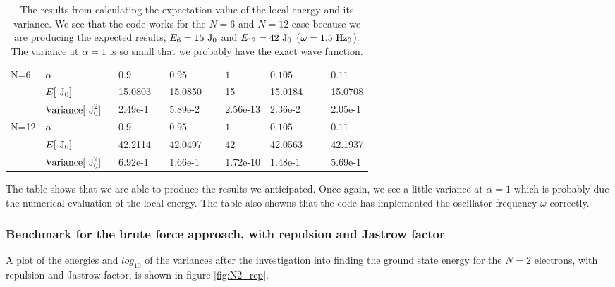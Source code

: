 \begin{table}[h!]
	\centering 
	\begin{tabular}{l @{}l @{ } l @{ } l @{ } l @{ } l @{ } l}
		\toprule
		\multirow{3}{*}{N=6}$~~\quad ~~$ & $\alpha~~~~$ & $0.9~~~~~~~~~~~~~$ & $0.95~~~~~~~~~~~~~$ & $1~~~~~~~~~~~~~$ & $0.105~~~~~~~~~~~~~$  & $0.11$ \\
		 & $E [~\textrm{J}_0]$ & 15.0803 & 15.0850 & 15 & 15.0184 & 15.0708\\ 
		 & $\textrm{Variance} [~\textrm{J}_0^2] ~~$ & 2.49e-1 & 5.89e-2 & 2.56e-13 & 2.36e-2 & 2.05e-1\\ 
		\midrule
		\multirow{3}{*}{N=12} & $\alpha~~~~$ & $0.9~~~~$ & $0.95~~~~$ & $1~~~~$ & $0.105~~~~$  & $0.11$ \\
		& $E [~\textrm{J}_0] $ & 42.2114 & 42.0497 & 42 & 42.0563 & 42.1937 \\ 
		& $\textrm{Variance} [~\textrm{J}_0^2] ~~$ & 6.92e-1 & 1.66e-1 & 1.72e-10 & 1.48e-1 & 5.69e-1\\ 
		\bottomrule
	\end{tabular}
	\caption{The results from calculating the expectation value of the local energy and its variance.
			We see that the code works for the $N=6$ and $N=12$ case because we are producing the expected results, $E_6 = 15 ~\textrm{J}_0$ and $E_{12} = 42 ~\textrm{J}_0$ ($\omega = 1.5 ~\textrm{Hz}_0$). 
			The variance at $\alpha=1$ is so small that we probably have the exact wave function.}
	\label{tab:N6_N12_norep}
\end{table}

The table shows that we are able to produce the results we anticipated.
Once again, we see a little variance at $\alpha=1$ which is probably due the numerical evaluation of the local energy. 
The table also showns that the code has implemented the oscillator frequency $\omega$ correctly. 










\subsubsection{Benchmark for the brute force approach, with repulsion and Jastrow factor}\label{sec:res_N2_rep}

A plot of the energies and $log_{10}$ of the variances after the investigation into finding the ground state energy for the $N=2$ electrons, with repulsion and Jastrow factor,
is shown in figure \ref{fig:N2_rep}.

